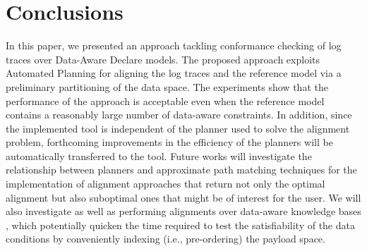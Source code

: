 \section{Conclusions}\label{sec:end}
In this paper, we presented an approach tackling conformance checking of log traces over Data-Aware Declare models. The proposed approach exploits Automated Planning for aligning the log traces and the reference model via a preliminary partitioning of the data space. The experiments show that the performance of the approach is acceptable even when the reference model contains a reasonably large number of data-aware constraints. In addition, since the implemented tool is independent of the planner used to solve the alignment problem, forthcoming improvements in the efficiency of the planners will be automatically transferred to the tool.
%
Future works will investigate the relationship between planners and approximate path matching techniques \cite{Myers1989} for the implementation of alignment approaches that return not only the optimal alignment but also suboptimal ones that might be of interest for the user. We will also investigate  as well as performing alignments over data-aware knowledge bases \cite{10.1007/978-3-319-39696-5_18}, which potentially quicken the time required to test the satisfiability of the data conditions by conveniently indexing (i.e., pre-ordering) the payload space.  %
